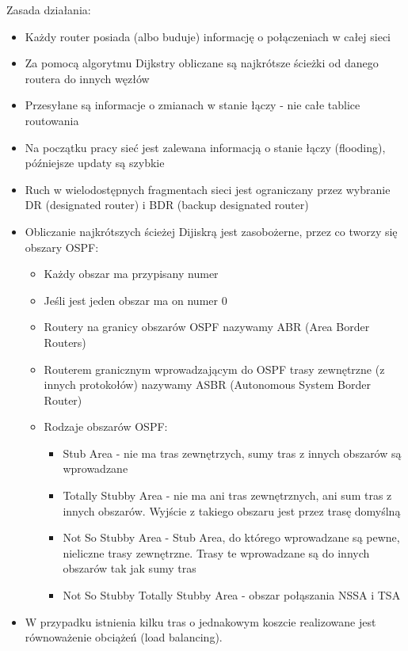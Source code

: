 \documentclass[12pt]{article}
\begin{document}
        Zasada działania:
        \begin{itemize}
            \item Każdy router posiada (albo buduje) informację o połączeniach w całej sieci
            \item Za pomocą algorytmu Dijkstry obliczane są najkrótsze ścieżki od danego routera do innych węzłów
            \item Przesyłane są informacje o zmianach w stanie łączy - nie całe tablice routowania
            \item Na początku pracy sieć jest zalewana informacją o stanie łączy (flooding), późniejsze updaty są szybkie
            \item Ruch w wielodostępnych fragmentach sieci jest ograniczany przez wybranie DR (designated router) i BDR (backup designated router)
            \item Obliczanie najkrótszych ścieżej Dijiskrą jest zasobożerne, przez co
            tworzy się obszary OSPF:
            \begin{itemize}
                \item Każdy obszar ma przypisany numer
                \item Jeśli jest jeden obszar ma on numer 0
                \item Routery na granicy obszarów OSPF nazywamy ABR (Area Border Routers)
                \item Routerem granicznym wprowadzającym do OSPF trasy zewnętrzne (z innych protokołów) nazywamy ASBR (Autonomous System Border Router)
                \item Rodzaje obszarów OSPF:
                \begin{itemize}
                    \item Stub Area - nie ma tras zewnętrzych, sumy tras z innych obszarów są wprowadzane
                    \item Totally Stubby Area - nie ma ani tras zewnętrznych, ani sum tras z innych obszarów. Wyjście z takiego obszaru jest przez trasę domyślną
                    \item Not So Stubby Area - Stub Area, do którego wprowadzane są pewne, nieliczne trasy zewnętrzne. Trasy te wprowadzane są do innych obszarów tak jak sumy tras
                    \item Not So Stubby Totally Stubby Area - obszar połąszania NSSA i TSA
                \end{itemize}
            \end{itemize}
            \item W przypadku istnienia kilku tras o jednakowym koszcie realizowane jest równoważenie obciążeń (load balancing).
        \end{itemize}
\end{document}
